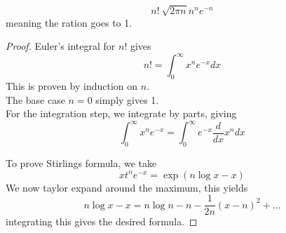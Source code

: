 \documentclass[../main.tex]{subfiles}
\begin{document}
\begin{thm}
	\[ 
	n! ~ \sqrt{2 \pi n} n^{n}e^{-n}	
	\]
	meaning the ration goes to 1.
	
	
\end{thm}
\begin{proof}
Euler's integral for $n!$ gives
\[ 
n! = \int_{ 0 }^{ \infty  }x^{n}e^{-x}dx
\]
This is proven by induction on $n$.\\
The base case $n=0$ simply gives 1.\\
For the integration step, we integrate by parts, giving
\[ 
\int_{ 0 }^{ \infty  }x^{n}e^{-x} = \int_{ 0 }^{ \infty  }e^{-x} \frac{d}{dx}x^{n} dx
\]

To prove Stirlings formula, we take
\[ 
	xt^{n}e^{-x}= \exp( n \log x -x ) 
\]
We now taylor expand around the maximum, this yields
\[ 
	n \log x - x = n \log n - n - \frac{1}{2n}( x-n)^{2} + \ldots
\]
integrating this gives the desired formula.


\end{proof}
\end{document}
